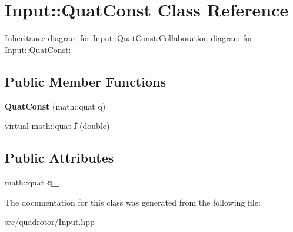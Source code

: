 \hypertarget{classInput_1_1QuatConst}{
\section{Input::QuatConst Class Reference}
\label{classInput_1_1QuatConst}
}
Inheritance diagram for Input::QuatConst:Collaboration diagram for Input::QuatConst:\subsection*{Public Member Functions}
\begin{DoxyCompactItemize}
\item 
\hypertarget{classInput_1_1QuatConst_a553b37a3fc9003b0b6eb9d65cb744c66}{
{\bfseries QuatConst} (math::quat q)}
\label{classInput_1_1QuatConst_a553b37a3fc9003b0b6eb9d65cb744c66}

\item 
\hypertarget{classInput_1_1QuatConst_a94f713bd2ccccdeaa2c2f93ce17db391}{
virtual math::quat {\bfseries f} (double)}
\label{classInput_1_1QuatConst_a94f713bd2ccccdeaa2c2f93ce17db391}

\end{DoxyCompactItemize}
\subsection*{Public Attributes}
\begin{DoxyCompactItemize}
\item 
\hypertarget{classInput_1_1QuatConst_a256ac5c9c9c3f1ff3967fd3df398e24c}{
math::quat {\bfseries q\_\-}}
\label{classInput_1_1QuatConst_a256ac5c9c9c3f1ff3967fd3df398e24c}

\end{DoxyCompactItemize}


The documentation for this class was generated from the following file:\begin{DoxyCompactItemize}
\item 
src/quadrotor/Input.hpp\end{DoxyCompactItemize}
